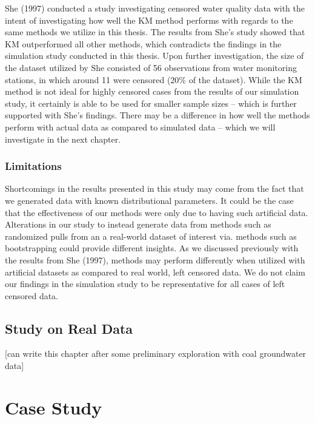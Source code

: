 \documentclass[12pt, twoside]{amherstthesis}
\begin{document}
She (1997) conducted a study investigating censored water quality data with the intent of investigating how well the KM method performs with regards to the same methods we utilize in this thesis. The results from She's study showed that KM outperformed all other methods, which contradicts the findings in the simulation study conducted in this thesis. Upon further investigation, the size of the dataset utilized by She consisted of 56 observations from water monitoring stations, in which around 11 were censored (20\% of the dataset). While the KM method is not ideal for highly censored cases from the results of our simulation study, it certainly is able to be used for smaller sample sizes -- which is further supported with She's findings. There may be a difference in how well the methods perform with actual data as compared to simulated data -- which we will investigate in the next chapter.

\hypertarget{limitations}{%
\subsection{Limitations}\label{limitations}}

Shortcomings in the results presented in this study may come from the fact that we generated data with known distributional parameters. It could be the case that the effectiveness of our methods were only due to having such artificial data. Alterations in our study to instead generate data from methods such as randomized pulls from an a real-world dataset of interest via. methods such as bootstrapping could provide different insights. As we discussed previously with the results from She (1997), methods may perform differently when utilized with artificial datasets as compared to real world, left censored data. We do not claim our findings in the simulation study to be representative for all cases of left censored data.

\hypertarget{real_data}{%
\section{Study on Real Data}\label{real_data}}

{[}can write this chapter after some preliminary exploration with coal groundwater data{]}

\hypertarget{casestudy}{%
\chapter{Case Study}\label{casestudy}}
\end{document}
